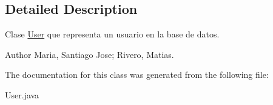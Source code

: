 \subsection{Detailed Description}
Clase \mbox{\hyperlink{classtrivia_1_1User}{User}} que representa un usuario en la base de datos. \begin{DoxyAuthor}{Author}
Maria, Santiago Jose; Rivero, Matias. 
\end{DoxyAuthor}


The documentation for this class was generated from the following file\+:\begin{DoxyCompactItemize}
\item 
User.\+java\end{DoxyCompactItemize}
